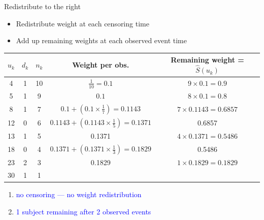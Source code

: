 \documentclass[10pt,t]{beamer}
\begin{document}
\begin{frame}{Redistribute to the right}
	\begin{itemize}
		\item Redistribute weight at each censoring time
		\item Add up remaining weights at each observed event time
	\end{itemize}
	\begin{footnotesize}
		\begin{tabular}{|c|c|c|c|c|}
			\hline
			$u_k$ & $d_k$ & $n_k$ & Weight per obs. & Remaining weight = $\widehat{S}(u_k)$ \\
			\hline
			4 & 1 & 10 & $\frac{1}{10} = 0.1$ & $9\times 0.1= 0.9$\\
			5 & 1 & 9 & $0.1$ &  $8\times 0.1= 0.8$  \\
			8 & 1 & 7 & $0.1 + (0.1\times \frac{1}{7}) = 0.1143$ & $7 \times 0.1143 = 0.6857$\\
			12 & 0 & 6 & $0.1143 +  (0.1143\times\frac{1}{5}) = 0.1371$ &  0.6857\\
			13 & 1 & 5 & 0.1371 & $4 \times 0.1371 =0.5486 $\\
			18 & 0 & 4 & $0.1371 + (0.1371\times \frac{1}{3}) = 0.1829$ & 0.5486\\
			23 & 2 & 3 & 0.1829&  $1 \times 0.1829 = 0.1829$\\
			30 & 1 & 1 & & \\
			\hline
		\end{tabular}
	\end{footnotesize}
	\begin{enumerate}
		\item \textcolor{blue}{no censoring --- no weight redistribution}
		\item \textcolor{blue}{1 subject remaining after 2 observed events}
	\end{enumerate}
\end{frame}
\end{document}

